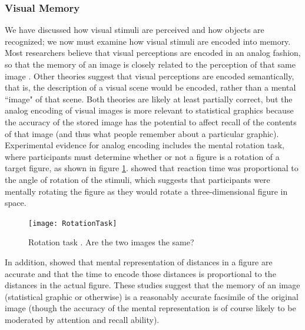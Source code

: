 \documentclass[11pt]{isuthesis}\usepackage[]{graphicx}\usepackage[]{color}
\begin{document}
\subsubsection{Visual Memory}
We have discussed how visual stimuli are perceived and how objects are recognized; we now must examine how visual stimuli are encoded into memory. Most researchers believe that visual perceptions are encoded in an analog fashion, so that the memory of an image is closely related to the perception of that same image \citep{cognition}. Other theories suggest that visual perceptions are encoded semantically, that is, the description of a visual scene would be encoded, rather than a mental ``image" of that scene. Both theories are likely at least partially correct, but the analog encoding of visual images is more relevant to statistical graphics because the accuracy of the stored image has the potential to affect recall of the contents of that image (and thus what people remember about a particular graphic). Experimental evidence for analog encoding includes the mental rotation task, where participants must determine whether or not a figure is a rotation of a target figure, as shown in figure \ref{fig:mentalRotation}. \citet{shepard1988mental} showed that reaction time was proportional to the angle of rotation of the stimuli, which suggests that participants were mentally rotating the figure as they would rotate a three-dimensional figure in space. 

\begin{figure}[htbp]\centering
\texttt{[image: RotationTask]}
\caption[Rotation Task]{Rotation task \protect\citep{shepard1988mental}. Are the two images the same?}\label{fig:mentalRotation}
\end{figure}

In addition, \citet{kosslyn1978visual} showed that mental representation of distances in a figure are accurate and that the time to encode those distances is proportional to the distances in the actual figure. These studies suggest that the memory of an image (statistical graphic or otherwise) is a reasonably accurate facsimile of the original image (though the accuracy of the mental representation is of course likely to be moderated by attention and recall ability). 
\end{document}
